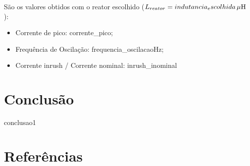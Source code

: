\documentclass[a4paper]{article}
\begin{document}
São os valores obtidos com o reator escolhido ($L_{reator} = {{indutancia_escolhida}} \, \mu \rm{H} $):
\begin{itemize}[label=\textendash]
	\item	Corrente de pico: {{corrente_pico}};
	\item	Frequência de Oscilação: {{frequencia_oscilacao}}Hz;
	\item	Corrente inrush / Corrente nominal: {{inrush_inominal}}
\end{itemize}

\section{Conclusão}
{{conclusao1}}

\section{Referências}
\end{document}
